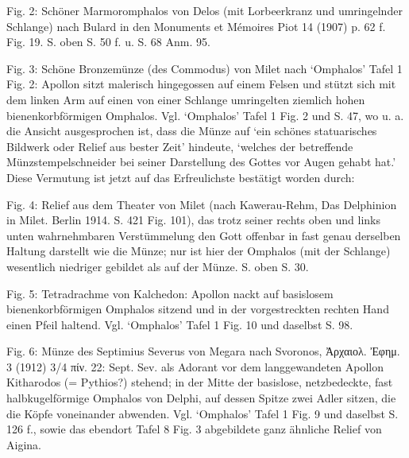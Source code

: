 \documentclass[a4paper, 11pt, oneside]{article}
\begin{document}
Fig. 2: Schöner Marmoromphalos von Delos (mit Lorbeerkranz und umringelnder Schlange) nach Bulard in den Monuments et Mémoires Piot 14 (1907) p. 62 f. Fig. 19. S. oben S. 50 f. u. S. 68 Anm. 95.

Fig. 3: Schöne Bronzemünze (des Commodus) von Milet nach `Omphalos' Tafel 1 Fig. 2: Apollon sitzt malerisch hingegossen auf einem Felsen und stützt sich mit dem linken Arm auf einen von einer Schlange umringelten ziemlich hohen bienenkorbförmigen Omphalos. Vgl. `Omphalos' Tafel 1 Fig. 2 und S. 47, wo u. a. die Ansicht ausgesprochen ist, dass die Münze auf `ein schönes statuarisches Bildwerk oder Relief aus bester Zeit' hindeute, `welches der betreffende Münzstempelschneider bei seiner Darstellung des Gottes vor Augen gehabt hat.' Diese Vermutung ist jetzt auf das Erfreulichste bestätigt worden durch:

Fig. 4: Relief aus dem Theater von Milet (nach Kawerau-Rehm, Das Delphinion in Milet. Berlin 1914. S. 421 Fig. 101), das trotz seiner rechts oben und links unten wahrnehmbaren Verstümmelung den Gott offenbar in fast genau derselben Haltung darstellt wie die Münze; nur ist hier der Omphalos (mit der Schlange) wesentlich niedriger gebildet als auf der Münze. S. oben S. 30.

Fig. 5: Tetradrachme von Kalchedon: Apollon nackt auf basislosem bienenkorbförmigen Omphalos sitzend und in der vorgestreckten rechten Hand einen Pfeil haltend. Vgl. `Omphalos' Tafel 1 Fig. 10 und daselbst S. 98.

Fig. 6: Münze des Septimius Severus von Megara nach Svoronos, Ἀρχαιολ. Ἐφημ. 3 (1912) 3/4 πίν. 22: Sept. Sev. als Adorant vor dem langgewandeten Apollon Kitharodos (= Pythios?) stehend; in der Mitte der basislose, netzbedeckte, fast halbkugelförmige Omphalos von Delphi, auf dessen Spitze zwei Adler sitzen, die die Köpfe voneinander abwenden. Vgl. `Omphalos' Tafel 1 Fig. 9 und daselbst S. 126 f., sowie das ebendort Tafel 8 Fig. 3 abgebildete ganz ähnliche Relief von Aigina.
\end{document}
